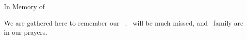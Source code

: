 \documentclass[12pt]{article}
\begin{document}
\begin{center}
\Large
In Memory of \peoplefullname
\end{center} 

We are gathered here to remember our \siblings\ \peoplename.
\They\ will be much missed, and \their\ 
family are in our prayers. 
\end{document}
